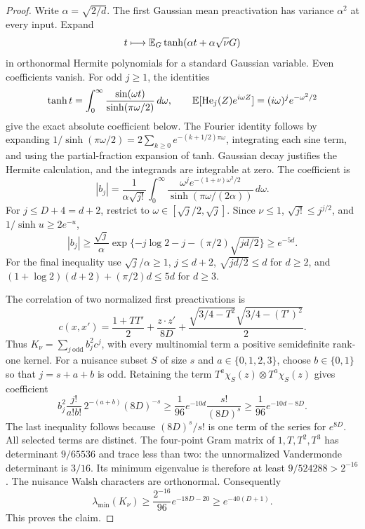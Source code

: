 \begin{proof}
Write $\alpha=\sqrt{2/d}$. The first Gaussian mean preactivation has variance $\alpha^2$ at every input. Expand
\[
 t\longmapsto\mathbb E_G\tanh(\alpha t+\alpha\sqrt\nu G)
\]
in orthonormal Hermite polynomials for a standard Gaussian variable. Even coefficients vanish. For odd $j\ge1$, the identities
\[
 \tanh t=\int_0^\infty\frac{\sin(\omega t)}{\sinh(\pi\omega/2)}\,d\omega,
 \qquad \mathbb E[\operatorname{He}_j(Z)e^{i\omega Z}]=(i\omega)^j e^{-\omega^2/2}
\]
give the exact absolute coefficient below. The Fourier identity follows by expanding $1/\sinh(\pi\omega/2)=2\sum_{k\ge0}e^{-(k+1/2)\pi\omega}$, integrating each sine term, and using the partial-fraction expansion of tanh. Gaussian decay justifies the Hermite calculation, and the integrands are integrable at zero. The coefficient is
\[
 |b_j|=\frac1{\alpha\sqrt{j!}}\int_0^\infty
 \frac{\omega^j e^{-(1+\nu)\omega^2/2}}
      {\sinh(\pi\omega/(2\alpha))}\,d\omega.
\]
For $j\le D+4=d+2$, restrict to $\omega\in[\sqrt j/2,\sqrt j]$. Since $\nu\le1$, $\sqrt{j!}\le j^{j/2}$, and $1/\sinh u\ge2e^{-u}$,
\[
 |b_j|\ge\frac{\sqrt j}{\alpha}
       \exp\{-j\log2-j-(\pi/2)\sqrt{jd/2}\}\ge e^{-5d}.
\]
For the final inequality use $\sqrt j/\alpha\ge1$, $j\le d+2$, $\sqrt{jd/2}\le d$ for $d\ge2$, and
$(1+\log2)(d+2)+(\pi/2)d\le5d$ for $d\ge3$.

The correlation of two normalized first preactivations is
\[
 c(x,x')=\frac{1+TT'}2+\frac{z\cdot z'}{8D}
            +\frac{\sqrt{3/4-T^2}\sqrt{3/4-(T')^2}}2.
\]
Thus $K_\nu=\sum_{j\ \mathrm{odd}}b_j^2c^j$, with every multinomial term a positive semidefinite rank-one kernel. For a nuisance subset $S$ of size $s$ and $a\in\{0,1,2,3\}$, choose $b\in\{0,1\}$ so that $j=s+a+b$ is odd. Retaining the term $T^a\chi_S(z)\otimes T^a\chi_S(z)$ gives coefficient
\[
 b_j^2\frac{j!}{a!b!}\,2^{-(a+b)}(8D)^{-s}
 \ge \frac1{96}e^{-10d}\frac{s!}{(8D)^s}
 \ge\frac1{96}e^{-10d-8D}.
\]
The last inequality follows because $(8D)^s/s!$ is one term of the series for $e^{8D}$. All selected terms are distinct. The four-point Gram matrix of $1,T,T^2,T^3$ has determinant $9/65536$ and trace less than two: the unnormalized Vandermonde determinant is $3/16$. Its minimum eigenvalue is therefore at least $9/524288>2^{-16}$. The nuisance Walsh characters are orthonormal. Consequently
\[
 \lambda_{\min}(K_\nu)
 \ge\frac{2^{-16}}{96}e^{-18D-20}\ge e^{-40(D+1)}.
\]
This proves the claim.
\end{proof}

